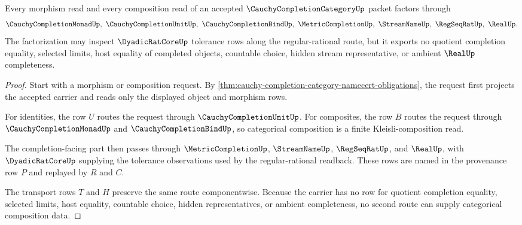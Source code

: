\begin{theorem}
\label{thm:cauchy-completion-category-kleisli-factorization}
Every morphism read and every composition read of an accepted $\CauchyCompletionCategoryUp$ packet factors through
$$
\CauchyCompletionMonadUp,\ \CauchyCompletionUnitUp,\ \CauchyCompletionBindUp,\ \MetricCompletionUp,\ \StreamNameUp,\ \RegSeqRatUp,\ \RealUp .
$$
The factorization may inspect $\DyadicRatCoreUp$ tolerance rows along the regular-rational route, but it exports no quotient completion equality, selected limits, host equality of completed objects, countable choice, hidden stream representative, or ambient $\RealUp$ completeness.
\end{theorem}
\begin{proof}
Start with a morphism or composition request. By \autoref{thm:cauchy-completion-category-namecert-obligations}, the request first projects the accepted carrier and reads only the displayed object and morphism rows.

For identities, the row $U$ routes the request through $\CauchyCompletionUnitUp$. For composites, the row $B$ routes the request through $\CauchyCompletionMonadUp$ and $\CauchyCompletionBindUp$, so categorical composition is a finite Kleisli-composition read.

The completion-facing part then passes through $\MetricCompletionUp$, $\StreamNameUp$, $\RegSeqRatUp$, and $\RealUp$, with $\DyadicRatCoreUp$ supplying the tolerance observations used by the regular-rational readback. These rows are named in the provenance row $P$ and replayed by $R$ and $C$.

The transport rows $T$ and $H$ preserve the same route componentwise. Because the carrier has no row for quotient completion equality, selected limits, host equality, countable choice, hidden representatives, or ambient completeness, no second route can supply categorical composition data.
\end{proof}



